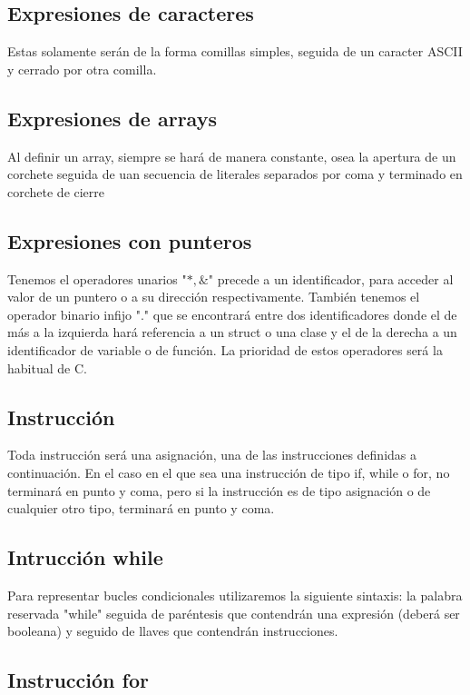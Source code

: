 \documentclass{article}
\begin{document}
\subsection{Expresiones de caracteres\footnotemark[1]}
Estas solamente serán de la forma comillas simples, seguida de un caracter ASCII y cerrado por otra comilla.

\subsection{Expresiones de arrays\footnotemark[1]}
Al definir un array, siempre se hará de manera constante, osea la apertura de un corchete seguida de uan secuencia de literales separados por coma y terminado en corchete de cierre


\subsection{Expresiones con punteros}

Tenemos el operadores unarios "$*,\&$" precede a un identificador, para acceder al valor de un puntero o a su dirección respectivamente.
También tenemos el operador binario infijo "." que se encontrará entre dos identificadores donde el de más a la izquierda hará referencia a un struct o una clase y el de la derecha a un identificador de variable o de función. La prioridad de estos operadores será la habitual de C.


\subsection{Instrucción}
Toda instrucción será una asignación, una de las instrucciones definidas a continuación. En el caso en el que sea una instrucción de tipo if, while o for, no terminará en punto y coma, pero si la instrucción es de tipo asignación o de cualquier otro tipo, terminará en punto y coma.


\subsection{Intrucción while}

Para representar bucles condicionales utilizaremos la siguiente sintaxis: la palabra reservada "while" seguida de paréntesis que contendrán una expresión (deberá ser booleana) y seguido de llaves que contendrán instrucciones.

\subsection{Instrucción for}
\end{document}
